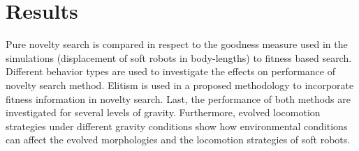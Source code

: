 \documentclass{sig-alternate}
\begin{document}
\section{Results}
Pure novelty search is compared in respect to the goodness measure used in the simulations (displacement of soft robots in body-lengths) to fitness based search. Different behavior types are used to investigate the effects on performance of novelty search method. Elitism is used in a proposed methodology to incorporate fitness information in novelty search. Last, the performance of both methods are investigated for several levels of gravity. Furthermore, evolved locomotion strategies under different gravity conditions show how environmental conditions can affect the evolved morphologies and the locomotion strategies of soft robots.

\end{document}
